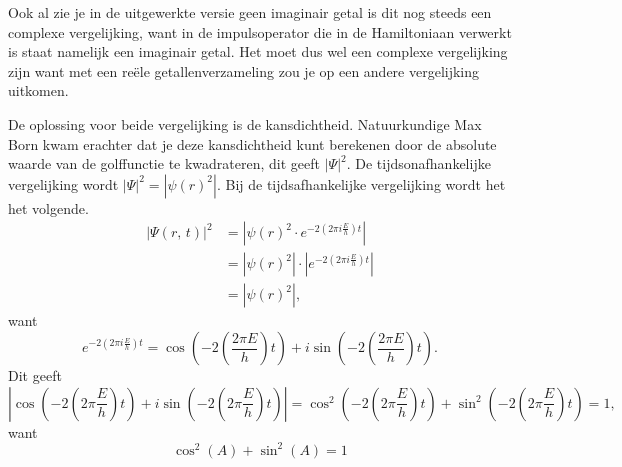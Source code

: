 \documentclass[11pt,fleqn]{book} %
\begin{document}
Ook al zie je in de uitgewerkte versie geen imaginair getal is dit nog steeds een complexe vergelijking, want in de impulsoperator die in de Hamiltoniaan verwerkt is staat namelijk een imaginair getal. Het moet dus wel een complexe vergelijking zijn want met een reële getallenverzameling zou je op een andere vergelijking uitkomen.

De oplossing voor beide vergelijking is de kansdichtheid. Natuurkundige Max Born kwam erachter dat je deze kansdichtheid kunt berekenen door de absolute waarde van de golffunctie te kwadrateren, dit geeft ${\left|\Psi\right|}^2$. De tijdsonafhankelijke vergelijking wordt ${\left|\Psi\right|}^2=\left|{\psi(r)}^2\right|$. Bij de tijdsafhankelijke vergelijking wordt het het volgende\cite{maf}.
\begin{align}\label{eq:psipsi}
{\left|\Psi(r,\,t)\right|}^2 &=\left|{\psi(r)}^2\cdot e^{-2(2\pi i \frac{E}{h})t}\right|\nonumber\\
&=\left|{\psi(r)}^2\right|\cdot\left|e^{-2(2\pi i\frac{E}{h})t}\right|\nonumber\\
&=\left|{\psi(r)}^2\right|,
\end{align}
want
\begin{displaymath}
e^{-2(2\pi i \frac{E}{h})t}=\cos{\left(-2\left(\frac{2\pi E}{h}\right)t\right)}+i\sin{\left(-2\left(\frac{2\pi E}{h}\right)t\right)}.
\end{displaymath}
Dit geeft
\begin{displaymath}
\left|\cos{\left(-2\left(2\pi\frac{E}{h}\right)t\right)}+i\sin{\left(-2\left(2\pi\frac{E}{h}\right)t\right)}\right|=\cos^2{\left(-2\left(2\pi\frac{E}{h}\right)t\right)}+\sin^2{\left(-2\left(2\pi\frac{E}{h}\right)t\right)}=1,
\end{displaymath}
want
\begin{displaymath}
\cos^2{\left(A\right)}+\sin^2{\left(A\right)}=1
\end{displaymath}
\end{document}
